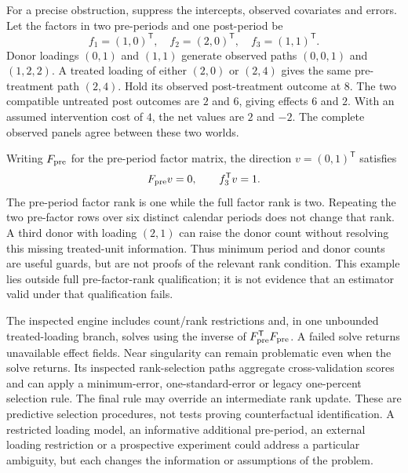 For a precise obstruction, suppress the intercepts, observed covariates and
errors. Let the factors in two pre-periods and one post-period be
\begin{equation}
\label{exec21:gsynth-witness}
 f_1=(1,0)^{\mathsf T},\quad f_2=(2,0)^{\mathsf T},\quad
 f_3=(1,1)^{\mathsf T}.
\end{equation}
Donor loadings $(0,1)$ and $(1,1)$ generate observed paths $(0,0,1)$ and
$(1,2,2)$. A treated loading of either $(2,0)$ or $(2,4)$ gives the same
pre-treatment path $(2,4)$. Hold its observed post-treatment outcome at $8$.
The two compatible untreated post outcomes are $2$ and $6$, giving effects
$6$ and $2$. With an assumed intervention cost of $4$, the net values are $2$
and $-2$. The complete observed panels agree between these two worlds.
\cite{exec21_gsynth_reference}

Writing $F_{\rm pre}$ for the pre-period factor matrix, the direction
$v=(0,1)^{\mathsf T}$ satisfies
\begin{equation}
\label{exec21:gsynth-null}
 F_{\rm pre}v=0,\qquad f_3^{\mathsf T}v=1.
\end{equation}
The pre-period factor rank is one while the full factor rank is two.
Repeating the two pre-factor rows over six distinct calendar periods does
not change that rank. A third donor with loading $(2,1)$ can raise the donor
count without resolving this missing treated-unit information. Thus minimum
period and donor counts are useful guards, but are not proofs of the relevant
rank condition. This example lies outside full pre-factor-rank qualification;
it is not evidence that an estimator valid under that qualification fails.
\cite{exec21_gsynth_reference}

The inspected engine includes count/rank restrictions and, in one unbounded
treated-loading branch, solves using the inverse of
$F_{\rm pre}^{\mathsf T}F_{\rm pre}$. A failed solve returns unavailable
effect fields. Near singularity can remain problematic even when the solve
returns. Its inspected rank-selection paths aggregate cross-validation
scores and can apply a minimum-error, one-standard-error or legacy
one-percent selection rule. The final rule may override an intermediate
rank update. These are predictive selection procedures, not tests proving
counterfactual identification. A restricted loading model, an informative
additional pre-period, an external loading restriction or a prospective
experiment could address a particular ambiguity, but each changes the
information or assumptions of the problem. \cite{exec21_gsynth_engine}

